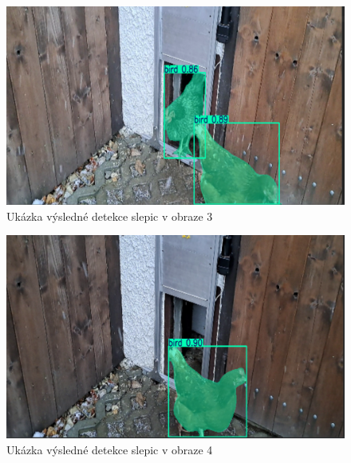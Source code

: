 \begin{figure}[h]
    \centering
    \includegraphics[width=\textwidth]{img/chicken_detection3}
    \caption{Ukázka výsledné detekce slepic v obraze 3}
    \label{fig:chicken_detection3}
\end{figure}
\begin{figure}[h]
    \centering
    \includegraphics[width=\textwidth]{img/chicken_detection4}
    \caption{Ukázka výsledné detekce slepic v obraze 4}
    \label{fig:chicken_detection4}
\end{figure}
\newpage

